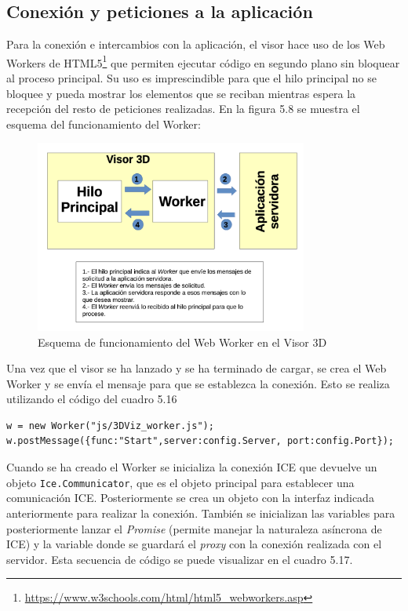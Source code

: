 \subsection{Conexión y peticiones a la aplicación}
Para la conexión e intercambios con la aplicación, el visor hace uso de los Web Workers de HTML5\footnote{\url{https://www.w3schools.com/html/html5_webworkers.asp}} que permiten ejecutar código en segundo plano sin bloquear al proceso principal. Su uso es imprescindible para que el hilo principal no se bloquee y pueda mostrar los elementos que se reciban mientras espera la recepción del resto de peticiones realizadas. En la figura 5.8 se muestra el esquema del funcionamiento del Worker:

\begin{figure}[H]
  \begin{center}
    \includegraphics[width=0.8\textwidth]{figures/esquemaworker.png}
		\caption{Esquema de funcionamiento del Web Worker en el Visor 3D}
		\label{fig.diseno3dviz}
		\end{center}
\end{figure}

Una vez que el visor se ha lanzado y se ha terminado de cargar, se crea el Web Worker y se envía el mensaje para que se establezca la conexión. Esto se realiza utilizando el código del cuadro 5.16

\begin{lstlisting}[caption= Creación del Worker, label=cod.worker]
w = new Worker("js/3DViz_worker.js");
w.postMessage({func:"Start",server:config.Server, port:config.Port});
\end{lstlisting}

Cuando se ha creado el Worker se inicializa la conexión ICE que devuelve un objeto \texttt{Ice.Communicator}, que es el objeto principal para establecer una comunicación ICE. Posteriormente se crea un objeto con la interfaz indicada anteriormente para realizar la conexión. También se inicializan las variables para posteriormente lanzar el \textit{Promise} (permite manejar la naturaleza asíncrona de ICE) y la variable donde se guardará el \textit{proxy} con la conexión realizada con el servidor. Esta secuencia de código se puede visualizar en el cuadro 5.17.

